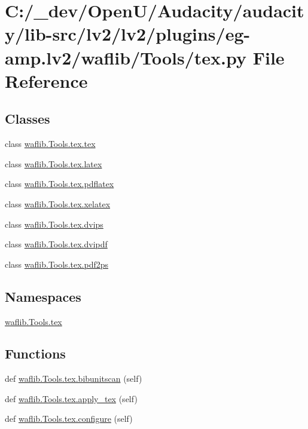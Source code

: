 \hypertarget{lv2_2plugins_2eg-amp_8lv2_2waflib_2_tools_2tex_8py}{}\section{C\+:/\+\_\+dev/\+Open\+U/\+Audacity/audacity/lib-\/src/lv2/lv2/plugins/eg-\/amp.lv2/waflib/\+Tools/tex.py File Reference}
\label{lv2_2plugins_2eg-amp_8lv2_2waflib_2_tools_2tex_8py}
\subsection*{Classes}
\begin{DoxyCompactItemize}
\item 
class \hyperlink{classwaflib_1_1_tools_1_1tex_1_1tex}{waflib.\+Tools.\+tex.\+tex}
\item 
class \hyperlink{classwaflib_1_1_tools_1_1tex_1_1latex}{waflib.\+Tools.\+tex.\+latex}
\item 
class \hyperlink{classwaflib_1_1_tools_1_1tex_1_1pdflatex}{waflib.\+Tools.\+tex.\+pdflatex}
\item 
class \hyperlink{classwaflib_1_1_tools_1_1tex_1_1xelatex}{waflib.\+Tools.\+tex.\+xelatex}
\item 
class \hyperlink{classwaflib_1_1_tools_1_1tex_1_1dvips}{waflib.\+Tools.\+tex.\+dvips}
\item 
class \hyperlink{classwaflib_1_1_tools_1_1tex_1_1dvipdf}{waflib.\+Tools.\+tex.\+dvipdf}
\item 
class \hyperlink{classwaflib_1_1_tools_1_1tex_1_1pdf2ps}{waflib.\+Tools.\+tex.\+pdf2ps}
\end{DoxyCompactItemize}
\subsection*{Namespaces}
\begin{DoxyCompactItemize}
\item 
 \hyperlink{namespacewaflib_1_1_tools_1_1tex}{waflib.\+Tools.\+tex}
\end{DoxyCompactItemize}
\subsection*{Functions}
\begin{DoxyCompactItemize}
\item 
def \hyperlink{namespacewaflib_1_1_tools_1_1tex_a0995543408e2b3f7705b148ffcce08b3}{waflib.\+Tools.\+tex.\+bibunitscan} (self)
\item 
def \hyperlink{namespacewaflib_1_1_tools_1_1tex_ac13f6c937ac7ea4af8d30e2a71f312f0}{waflib.\+Tools.\+tex.\+apply\+\_\+tex} (self)
\item 
def \hyperlink{namespacewaflib_1_1_tools_1_1tex_a63e6ed812ce192be695521518632025a}{waflib.\+Tools.\+tex.\+configure} (self)
\end{DoxyCompactItemize}
